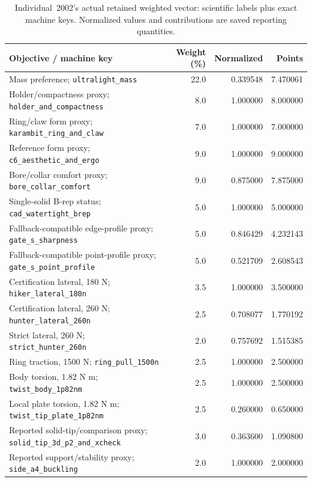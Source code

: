 \begin{table}[t]
\centering
\caption{Individual~2002's actual retained weighted vector: scientific labels plus exact machine keys. Normalized values and contributions are saved reporting quantities.}
\label{tab:weighted-vector-details}
\small
\setlength{\tabcolsep}{4pt}
\begin{tabular}{@{}>{\raggedright\arraybackslash}p{}rrr@{}}
\toprule
\textbf{Objective / machine key} & \textbf{Weight (\%)} & \textbf{Normalized} & \textbf{Points} \\
\midrule
Mass preference; \nolinkurl{ultralight_mass} & 22.0 & 0.339548 & 7.470061 \\
Holder/compactness proxy; \nolinkurl{holder_and_compactness} & 8.0 & 1.000000 & 8.000000 \\
Ring/claw form proxy; \nolinkurl{karambit_ring_and_claw} & 7.0 & 1.000000 & 7.000000 \\
Reference form proxy; \nolinkurl{c6_aesthetic_and_ergo} & 9.0 & 1.000000 & 9.000000 \\
Bore/collar comfort proxy; \nolinkurl{bore_collar_comfort} & 9.0 & 0.875000 & 7.875000 \\
Single-solid B-rep status; \nolinkurl{cad_watertight_brep} & 5.0 & 1.000000 & 5.000000 \\
Fallback-compatible edge-profile proxy; \nolinkurl{gate_s_sharpness} & 5.0 & 0.846429 & 4.232143 \\
Fallback-compatible point-profile proxy; \nolinkurl{gate_s_point_profile} & 5.0 & 0.521709 & 2.608543 \\
Certification lateral, 180 N; \nolinkurl{hiker_lateral_180n} & 3.5 & 1.000000 & 3.500000 \\
Certification lateral, 260 N; \nolinkurl{hunter_lateral_260n} & 2.5 & 0.708077 & 1.770192 \\
Strict lateral, 260 N; \nolinkurl{strict_hunter_260n} & 2.0 & 0.757692 & 1.515385 \\
Ring traction, 1500 N; \nolinkurl{ring_pull_1500n} & 2.5 & 1.000000 & 2.500000 \\
Body torsion, 1.82 N m; \nolinkurl{twist_body_1p82nm} & 2.5 & 1.000000 & 2.500000 \\
Local plate torsion, 1.82 N m; \nolinkurl{twist_tip_plate_1p82nm} & 2.5 & 0.260000 & 0.650000 \\
Reported solid-tip/comparison proxy; \nolinkurl{solid_tip_3d_p2_and_xcheck} & 3.0 & 0.363600 & 1.090800 \\
Reported support/stability proxy; \nolinkurl{side_a4_buckling} & 2.0 & 1.000000 & 2.000000 \\

\end{tabular}
\end{table}
